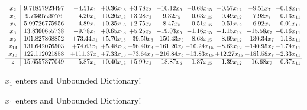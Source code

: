 \documentclass[9pt]{article}
\begin{document}
 \[\begin{array}{c| c c@{\hskip 2pt} c@{\hskip 2pt} c@{\hskip 2pt} c@{\hskip 2pt} c@{\hskip 2pt} c@{\hskip 2pt} c@{\hskip 2pt} c@{\hskip 2pt} }
 x_{2}   &  9.71857923497 & +  4.51 x_{1} & +  0.36 x_{13} & +  3.78 x_{3} & -10.12 x_{5} & -0.68 x_{15} & +  0.57 x_{12} & -9.51 x_{7} & -0.18 x_{11}\\
 x_{4}   &  9.7349726776 & +  4.20 x_{1} & +  0.26 x_{13} & +  3.28 x_{3} & -9.32 x_{5} & -0.63 x_{15} & +  0.49 x_{12} & -7.98 x_{7} & -0.13 x_{11}\\
 x_{8}   &  5.99726775956 & +  4.89 x_{1} & +  0.35 x_{13} & +  2.75 x_{3} & -8.47 x_{5} & -0.51 x_{15} & +  0.51 x_{12} & -6.92 x_{7} & -0.01 x_{11}\\
 x_{6}   &  13.8360655738 & +  9.78 x_{1} & +  0.65 x_{13} & +  5.25 x_{3} & -19.03 x_{5} & -1.16 x_{15} & +  1.15 x_{12} & -15.58 x_{7} & -0.16 x_{11}\\
 x_{9}   &  101.827868852 & + 73.44 x_{1} & +  5.70 x_{13} & + 39.50 x_{3} & -150.43 x_{5} & -8.68 x_{15} & +  8.69 x_{12} & -130.34 x_{7} & -1.18 x_{11}\\
 x_{14}   &  131.642076503 & + 74.63 x_{1} & +  5.48 x_{13} & + 56.40 x_{3} & -161.20 x_{5} & -10.24 x_{15} & +  8.62 x_{12} & -140.95 x_{7} & -1.74 x_{11}\\
 x_{10}   &  122.112021858 & + 111.37 x_{1} & +  7.33 x_{13} & + 73.64 x_{3} & -216.84 x_{5} & -13.83 x_{15} & + 12.27 x_{12} & -181.58 x_{7} & -2.33 x_{11}\\
\hline
z    &  15.6557377049 & +  5.87 x_{1} & +  0.40 x_{13} & +  5.99 x_{3} & -18.87 x_{5} & -1.37 x_{15} & +  1.39 x_{12} & -16.68 x_{7} & -0.37 x_{11}\\
\end{array}\]


 $ x_{1} $ enters and Unbounded Dictionary!


 $ x_{1} $ enters and Unbounded Dictionary!
\end{document}
